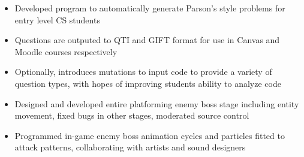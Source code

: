 \documentclass[10pt,a4paper,ragged2e,withhyper]{altacv}
\begin{document}
\begin{paracol}{2}
\divider

\begin{itemize}
    
    \item Developed program to automatically generate Parson's style problems for entry level CS students
    
    \item Questions are outputed to QTI and GIFT format for use in Canvas and Moodle courses respectively
    
    \item Optionally, introduces mutations to input code to provide a variety of question types, with hopes of improving students ability to analyze code
\end{itemize}

\divider




\begin{itemize}
\item Designed and developed entire platforming enemy boss stage including entity movement, fixed bugs in other stages, moderated source control

\item Programmed in-game enemy boss animation cycles and particles fitted to attack patterns, collaborating with artists and sound designers

\end{itemize}


\end{paracol}
\end{document}
